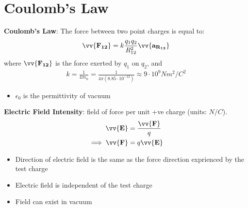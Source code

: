 \documentclass[10pt]{article}
\begin{document}
\section{Coulomb's Law}
\begin{theorem}
    \textbf{Coulomb's Law}: The force between two point charges is equal to:
    \begin{align}
        \vv{\mathbf{F_{12}}} = k \frac{q_1 q_2}{R_{12}^2} \vv{\mathbf{a_{R_{12}}}} 
    \end{align}
    where $\vv{\mathbf{F_{12}}}$ is the force exerted by $q_1$ on $q_2$, and
    \begin{align}
        k = \frac{1}{4\pi\epsilon_0} = \frac{1}{4\pi(8.85\cdot10^{-12})} \approx 9\cdot10^9 Nm^2/C^2       
    \end{align}
    \begin{itemize}
        \item $\epsilon_0$ is the permittivity of vacuum
    \end{itemize}    
\end{theorem}
\begin{definition}
    \textbf{Electric Field Intensity}: field of force per unit +ve charge (units: $N/C$).    
    \begin{align}
        \vv{\mathbf{E}} &= \frac{\vv{\mathbf{F}}}{q} \\ 
        \implies \vv{\mathbf{F}} &= q \vv{\mathbf{E}} 
    \end{align}
    \begin{itemize}
        \item Direction of electric field is the same as the force direction exprienced by the test charge        
        \item Electric field is independent of the test charge
        \item Field can exist in vacuum
    \end{itemize}
\end{definition}
\end{document}
